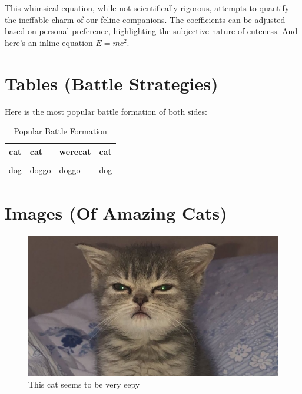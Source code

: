 \documentclass{article}
\begin{document}
        This whimsical equation, while not scientifically rigorous, attempts to quantify the ineffable charm of our feline companions. The coefficients can be adjusted based on personal preference, highlighting the subjective nature of cuteness. And here's an inline equation \( E = mc^2 \).

    \section{Tables (Battle Strategies)}
    
        Here is the most popular battle formation of both sides:
            \begin{table}[h]
            \centering
            \caption{Popular Battle Formation}
            \begin{tabular}{|l|l|l|l|}
            \hline
            cat & cat   & werecat      & cat \\ \hline
                &       &              &     \\ \hline
            dog & doggo & doggo        & dog \\ \hline
            \end{tabular}
            \label{tab:battle_formation} %
            \end{table}
    

    \section{Images (Of Amazing Cats)}
    
        \begin{figure}
            \centering
            \includegraphics[width=0.5\linewidth]{kitkuuuu1.jpg}
            \caption{This cat seems to be very eepy \cite{latex2e}}
            \label{fig:enter-label}
        \end{figure}
    
\end{document}

